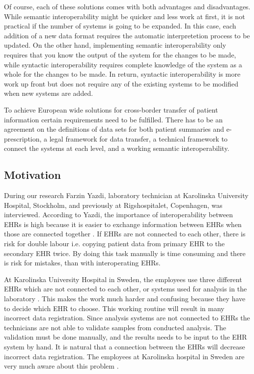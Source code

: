 \documentclass[14pt]{article}
\begin{document}
Of course, each of these solutions comes with both advantages and disadvantages.  While semantic interoperability might be quicker and less work at first, it is not practical if the number of systems is going to be expanded. In this case, each addition of a new data format requires the automatic interpretetion process to be updated.  On the other hand, implementing semantic interoperability only requires that you know the output of the system for the changes to be made, while syntactic interoperability requires complete knowledge of the system as a whole for the changes to be made.  In return, syntactic interoperability is more work up front but does not require any of the existing systems to be modified when new systems are added.

To achieve European wide solutions for cross-border transfer of patient information certain requirements need to be fulfilled. There has to be an agreement on the definitions of data sets for both patient summaries and e-prescription, a legal framework for data transfer, a technical framework to connect the systems at each level, and a working semantic \gls{interoperability}. \cite{epSOS1}

\subsection{Motivation}
\label{sec:techMotiv}
During our research Farzin Yazdi, laboratory technician at Karolinska University Hospital, Stockholm, and previously at Rigshospitalet, Copenhagen, was interviewed. According to Yazdi\cite{FarzinYazdi}, the importance of interoperability between EHRs is high because it is easier to exchange information between EHRs when those are connected together \cite{FarzinYazdi}. If EHRs are not connected to each other, there is risk for double labour i.e. copying patient data from primary EHR to the secondary EHR twice\cite{FarzinYazdi}. By doing this task manually is time consuming and there is risk for mistakes, than with interoperating EHRs\cite{FarzinYazdi}.

At Karolinska University Hospital in Sweden, the employees use three different EHRs which are not connected to each other, or systems used for analysis in the laboratory \cite{FarzinYazdi}. This makes the work much harder and confusing because they have to decide which EHR to choose. This working routine will result in many incorrect data registration. Since analysis systems are not connected to EHRs the technicians are not able to validate samples from conducted analysis. The validation must be done manually, and the results needs to be input to the  EHR system by hand\cite{FarzinYazdi}. It is natural that a connection between the EHRs will decrease incorrect data registration. The employees at Karolinska hospital in Sweden are very much aware about this problem \cite{FarzinYazdi}.
\end{document}
